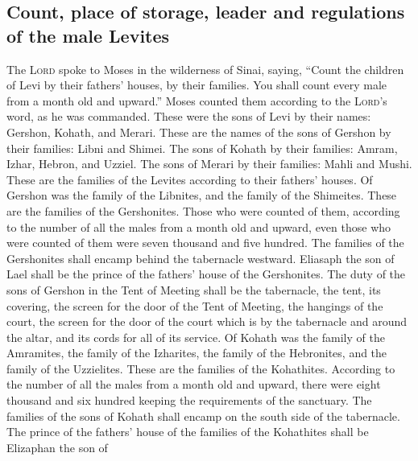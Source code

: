 \hypertarget{count-place-of-storage-leader-and-regulations-of-the-male-levites}{%
\subsection{Count, place of storage, leader and regulations of the male
Levites}\label{count-place-of-storage-leader-and-regulations-of-the-male-levites}}

 The \textsc{Lord} spoke to Moses in the wilderness of
Sinai, saying,  ``Count the children of Levi by their
fathers' houses, by their families. You shall count every male from a
month old and upward.''  Moses counted them according to
the \textsc{Lord}'s word, as he was commanded.  These
were the sons of Levi by their names: Gershon, Kohath, and Merari.
 These are the names of the sons of Gershon by their
families: Libni and Shimei.  The sons of Kohath by their
families: Amram, Izhar, Hebron, and Uzziel.  The sons of
Merari by their families: Mahli and Mushi. These are the families of the
Levites according to their fathers' houses.  Of Gershon
was the family of the Libnites, and the family of the Shimeites. These
are the families of the Gershonites.  Those who were
counted of them, according to the number of all the males from a month
old and upward, even those who were counted of them were seven thousand
and five hundred.  The families of the Gershonites shall
encamp behind the tabernacle westward.  Eliasaph the son
of Lael shall be the prince of the fathers' house of the Gershonites.
 The duty of the sons of Gershon in the Tent of Meeting
shall be the tabernacle, the tent, its covering, the screen for the door
of the Tent of Meeting,  the hangings of the court, the
screen for the door of the court which is by the tabernacle and around
the altar, and its cords for all of its service.  Of
Kohath was the family of the Amramites, the family of the Izharites, the
family of the Hebronites, and the family of the Uzzielites. These are
the families of the Kohathites.  According to the number
of all the males from a month old and upward, there were eight thousand
and six hundred keeping the requirements of the sanctuary.
 The families of the sons of Kohath shall encamp on the
south side of the tabernacle.  The prince of the fathers'
house of the families of the Kohathites shall be Elizaphan the son of
